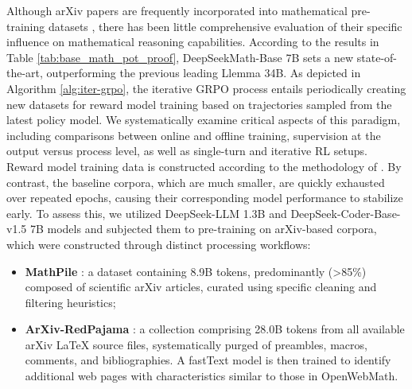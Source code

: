 Although arXiv papers are frequently incorporated into mathematical pre-training datasets \citep{minerva,gpt-f,llemma,mathpile}, there has been little comprehensive evaluation of their specific influence on mathematical reasoning capabilities. According to the results in Table \ref{tab:base_math_pot_proof}, DeepSeekMath-Base 7B sets a new state-of-the-art, outperforming the previous leading Llemma 34B. As depicted in Algorithm \ref{alg:iter-grpo}, the iterative GRPO process entails periodically creating new datasets for reward model training based on trajectories sampled from the latest policy model. We systematically examine critical aspects of this paradigm, including comparisons between online and offline training, supervision at the output versus process level, as well as single-turn and iterative RL setups. Reward model training data is constructed according to the methodology of \citep{wang2023math}. By contrast, the baseline corpora, which are much smaller, are quickly exhausted over repeated epochs, causing their corresponding model performance to stabilize early. To assess this, we utilized DeepSeek-LLM 1.3B and DeepSeek-Coder-Base-v1.5 7B \citep{deepseek-coder} models and subjected them to pre-training on arXiv-based corpora, which were constructed through distinct processing workflows:

\begin{itemize}[topsep=0pt]
    \item \textbf{MathPile} \citep{mathpile}: a dataset containing 8.9B tokens, predominantly (>85\%) composed of scientific arXiv articles, curated using specific cleaning and filtering heuristics;
    \item \textbf{ArXiv-RedPajama} \citep{redpajama}: a collection comprising 28.0B tokens from all available arXiv LaTeX source files, systematically purged of preambles, macros, comments, and bibliographies. A fastText model \citep{joulin2016fasttext} is then trained to identify additional web pages with characteristics similar to those in OpenWebMath. \end{itemize}

